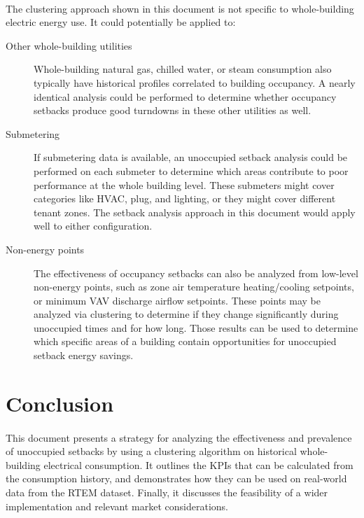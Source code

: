 \documentclass[a4paper]{article}
\begin{document}
\paragraph{}
The clustering approach shown in this document is not specific to whole-building electric energy use. It could potentially be applied to:
\begin{description}
\item[Other whole-building utilities]{Whole-building natural gas, chilled water, or steam consumption also typically have historical profiles correlated to building occupancy. A nearly identical analysis could be performed to determine whether occupancy setbacks produce good turndowns in these other utilities as well.}
\item[Submetering]{If submetering data is available, an unoccupied setback analysis could be performed on each submeter to determine which areas contribute to poor performance at the whole building level. These submeters might cover categories like HVAC, plug, and lighting, or they might cover different tenant zones. The setback analysis approach in this document would apply well to either configuration.}
\item[Non-energy points]{The effectiveness of occupancy setbacks can also be analyzed from low-level non-energy points, such as zone air temperature heating/cooling setpoints, or minimum VAV discharge airflow setpoints. These points may be analyzed via clustering to determine if they change significantly during unoccupied times and for how long. Those results can be used to determine which specific areas of a building contain opportunities for unoccupied setback energy savings.}
\end{description}

\section{Conclusion}

\paragraph{}
This document presents a strategy for analyzing the effectiveness and prevalence of unoccupied setbacks by using a clustering algorithm on historical whole-building electrical consumption. It outlines the KPIs that can be calculated from the consumption history, and demonstrates how they can be used on real-world data from the RTEM dataset. Finally, it discusses the feasibility of a wider implementation and relevant market considerations.
\end{document}
